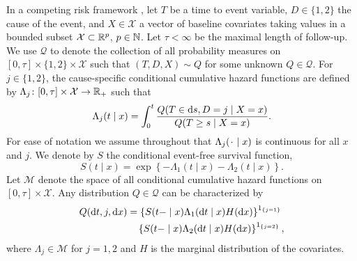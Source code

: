 \documentclass[a4,danish]{article}
\begin{document}
In a competing risk framework \citep{andersen2012statistical}, let \( T\) be a
time to event variable, \(D\in\{1,2\}\) the cause of the event, and
$X \in \mathcal{X}$ a vector of baseline covariates taking values in a bounded
subset \( \mathcal{X} \subset \mathbb{R}^p \), \( p\in\mathbb{N} \). Let $\tau< \infty$ be the
maximal length of follow-up. We use \( \mathcal{Q} \) to denote the collection
of all probability measures on \( [0,\tau] \times \{1,2\}\times \mathcal{X} \)
such that \( (T, D, X) \sim Q \) for some unknown \( Q \in \mathcal{Q} \). For
\(j\in\{1,2\}\), the cause-specific conditional cumulative hazard functions are
defined by
\( \Lambda_{j} \colon [0, \tau] \times \mathcal{X} \rightarrow \mathbb{R}_+ \) such that
\begin{equation*}
  \Lambda_{j}(t \mid x) = \int_0^t\frac{  Q(T \in \mathop{}\!\mathrm{d} s, D=j \mid X=x )}{Q(T \geq s \mid X=x )}.
\end{equation*}
For ease of notation we assume throughout that \( \Lambda_j(\blank \mid x) \) is
continuous for all \( x \) and \( j \). We denote by \(S\) the conditional
event-free survival function,
\begin{equation}
  \label{eq:surv-def}
  S(t \mid x)=\exp\left\{-\Lambda_{1}(t \mid x)-\Lambda_{2}(t \mid x)\right\}.
\end{equation}
Let \( \mathcal{M} \) denote the space of all conditional cumulative hazard
functions on \( [0,\tau] \times\mathcal{X}\). Any distribution
\( Q \in \mathcal{Q} \) can be characterized by
\begin{equation*}
  \label{eq:parametrizeQ}
  \begin{split}
    Q(\mathop{}\!\mathrm{d} t,j,\mathop{}\!\mathrm{d} x)&= \left\{S(t- \mid x)\Lambda_1(\mathop{}\!\mathrm{d} t \mid x)H(\mathop{}\!\mathrm{d} x)\right\}^{1_{\{j=1\}}}\\
                        &\quad\left\{S(t- \mid x)\Lambda_2(\mathop{}\!\mathrm{d} t \mid x)H(\mathop{}\!\mathrm{d} x)\right\}^{1_{\{j=2\}}},
  \end{split}
\end{equation*}
where \(\Lambda_{j} \in \mathcal{M}\) for \(j=1,2\) and \(H\) is the marginal
distribution of the covariates.
\end{document}
